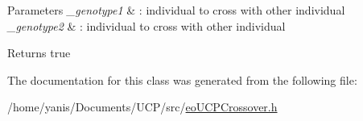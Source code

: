 \begin{DoxyParams}{\-Parameters}
{\em \-\_\-genotype1} & \-: individual to cross with other individual \\
\hline
{\em \-\_\-genotype2} & \-: individual to cross with other individual \\
\hline
\end{DoxyParams}
\begin{DoxyReturn}{\-Returns}
true 
\end{DoxyReturn}


\-The documentation for this class was generated from the following file\-:\begin{DoxyCompactItemize}
\item 
/home/yanis/\-Documents/\-U\-C\-P/src/\hyperlink{eo_u_c_p_crossover_8h}{eo\-U\-C\-P\-Crossover.\-h}\end{DoxyCompactItemize}
